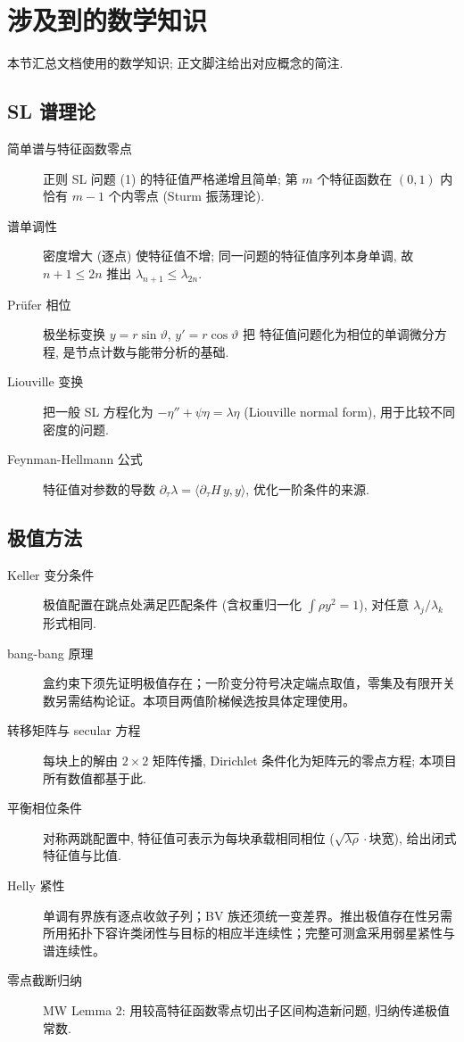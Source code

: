 \documentclass[UTF8]{ctexart}
\begin{document}
\section{涉及到的数学知识}

本节汇总文档使用的数学知识; 正文脚注给出对应概念的简注.

\subsection{SL 谱理论}

\begin{description}
	\item[简单谱与特征函数零点] 正则 SL 问题 (1) 的特征值严格递增且简单;
		第 $m$ 个特征函数在 $(0,1)$ 内恰有 $m-1$ 个内零点 (Sturm 振荡理论).
	\item[谱单调性] 密度增大 (逐点) 使特征值不增; 同一问题的特征值序列本身单调,
		故 $n+1 \leq 2n$ 推出 $\lambda_{n+1} \leq \lambda_{2n}$.
	\item[Pr\"ufer 相位] 极坐标变换 $y = r\sin\vartheta$, $y' = r\cos\vartheta$ 把
		特征值问题化为相位的单调微分方程, 是节点计数与能带分析的基础.
	\item[Liouville 变换] 把一般 SL 方程化为 $-\eta'' + \psi\eta = \lambda\eta$
		(Liouville normal form), 用于比较不同密度的问题.
	\item[Feynman-Hellmann 公式] 特征值对参数的导数 $\partial_\tau \lambda = \langle \partial_\tau H \, y, y\rangle$,
		优化一阶条件的来源.
\end{description}

\subsection{极值方法}

\begin{description}
	\item[Keller 变分条件] 极值配置在跳点处满足匹配条件 (含权重归一化
		$\int \rho y^2 = 1$), 对任意 $\lambda_j/\lambda_k$ 形式相同.
	\item[bang-bang 原理] 盒约束下须先证明极值存在；一阶变分符号决定端点取值，零集及有限开关数另需结构论证。本项目两值阶梯候选按具体定理使用。
	\item[转移矩阵与 secular 方程] 每块上的解由 $2\times 2$ 矩阵传播,
		Dirichlet 条件化为矩阵元的零点方程; 本项目所有数值都基于此.
	\item[平衡相位条件] 对称两跳配置中, 特征值可表示为每块承载相同相位
		($\sqrt{\lambda\rho}\cdot\text{块宽}$), 给出闭式特征值与比值.
	\item[Helly 紧性] 单调有界族有逐点收敛子列；BV 族还须统一变差界。推出极值存在性另需所用拓扑下容许类闭性与目标的相应半连续性；完整可测盒采用弱星紧性与谱连续性。
	\item[零点截断归纳] MW Lemma 2: 用较高特征函数零点切出子区间构造新问题,
		归纳传递极值常数.
\end{description}
\end{document}
